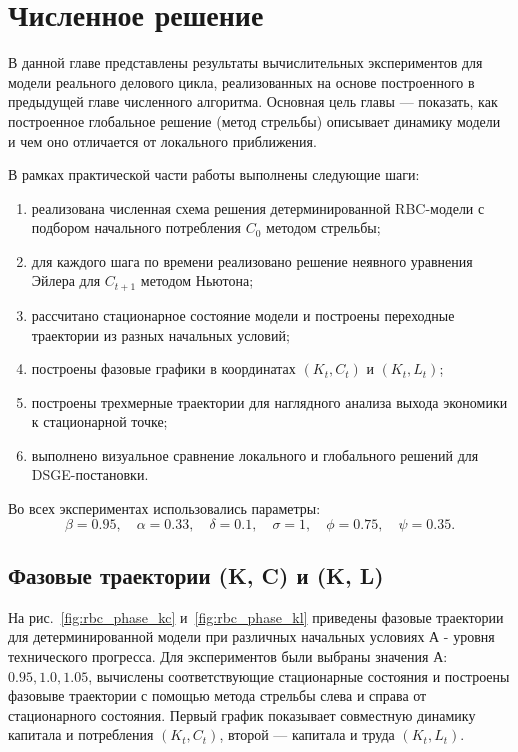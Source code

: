 \chapter{Численное решение}

В данной главе представлены результаты вычислительных экспериментов для модели реального делового цикла, реализованных на основе построенного в предыдущей главе численного алгоритма. Основная цель главы --- показать, как построенное глобальное решение (метод стрельбы) описывает динамику модели и чем оно отличается от локального приближения.

В рамках практической части работы выполнены следующие шаги:
\begin{enumerate}
    \item реализована численная схема решения детерминированной RBC-модели с подбором начального потребления \(C_0\) методом стрельбы;
    \item для каждого шага по времени реализовано решение неявного уравнения Эйлера для \(C_{t+1}\) методом Ньютона;
    \item рассчитано стационарное состояние модели и построены переходные траектории из разных начальных условий;
    \item построены фазовые графики в координатах \((K_t, C_t)\) и \((K_t, L_t)\);
    \item построены трехмерные траектории для наглядного анализа выхода экономики к стационарной точке;
    \item выполнено визуальное сравнение локального и глобального решений для DSGE-постановки.
\end{enumerate}

Во всех экспериментах использовались параметры:
\[
\beta = 0.95,\quad
\alpha = 0.33,\quad
\delta = 0.1,\quad
\sigma = 1,\quad
\phi = 0.75,\quad
\psi = 0.35.
\]


\section{Фазовые траектории (K, C) и (K, L)}

На рис.~\ref{fig:rbc_phase_kc} и~\ref{fig:rbc_phase_kl} приведены фазовые траектории для детерминированной модели при различных начальных условиях А - уровня технического прогресса. Для экспериментов были выбраны значения А: $0.95, 1.0, 1.05$, вычислены соответствующие стационарные состояния и построены фазовыве траектории с помощью метода стрельбы слева и справа от стационарного состояния. Первый график показывает совместную динамику капитала и потребления \((K_t, C_t)\), второй --- капитала и труда \((K_t, L_t)\).

